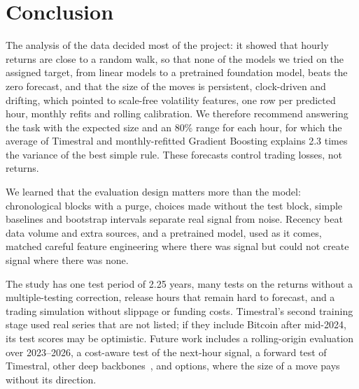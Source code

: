 \section{Conclusion}
\label{sec:conclusion}

The analysis of the data decided most of the project: it showed that
hourly returns are close to a random walk, so that none of the models we
tried on the assigned target, from linear models to a pretrained
foundation model, beats the zero forecast, and that the size of the
moves is persistent, clock-driven and drifting, which pointed to
scale-free volatility features, one row per predicted hour, monthly
refits and rolling calibration. We therefore recommend answering the
task with the expected size and an 80\% range for each hour, for which
the average of Timestral and monthly-refitted Gradient Boosting explains
2.3 times the variance of the best simple rule. These forecasts control
trading losses, not returns.

We learned that the evaluation design matters more than the model:
chronological blocks with a purge, choices made without the test block,
simple baselines and bootstrap intervals separate real signal from
noise. Recency beat data volume and extra sources, and a pretrained
model, used as it comes, matched careful feature engineering where there
was signal but could not create signal where there was none.

The study has one test period of 2.25 years, many tests on the returns
without a multiple-testing correction, release hours that remain hard to
forecast, and a trading simulation without slippage or funding costs.
Timestral's second training stage used real series that are not listed;
if they include Bitcoin after mid-2024, its test scores may be
optimistic. Future work includes a rolling-origin evaluation over
2023--2026, a cost-aware test of the next-hour signal, a forward test of
Timestral, other deep backbones~\cite{wang2024deep}, and options, where
the size of a move pays without its direction.